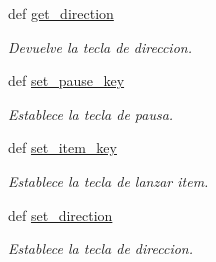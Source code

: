 \begin{DoxyCompactItemize}
def \hyperlink{classengine_1_1config_1_1Config_aa1230146da9219b1d708049842c817a3}{get\-\_\-direction}
\begin{DoxyCompactList}\small\item\em \-Devuelve la tecla de direccion. \end{DoxyCompactList}\item 
def \hyperlink{classengine_1_1config_1_1Config_a3b0cbd7f309301ddf8ef340f466da061}{set\-\_\-pause\-\_\-key}
\begin{DoxyCompactList}\small\item\em \-Establece la tecla de pausa. \end{DoxyCompactList}\item 
def \hyperlink{classengine_1_1config_1_1Config_abade5c277e0c3215c92ddfc5280bfba4}{set\-\_\-item\-\_\-key}
\begin{DoxyCompactList}\small\item\em \-Establece la tecla de lanzar item. \end{DoxyCompactList}\item 
def \hyperlink{classengine_1_1config_1_1Config_a8687f5ceb465bfd7edb717e324084c0a}{set\-\_\-direction}
\begin{DoxyCompactList}\small\item\em \-Establece la tecla de direccion. \end{DoxyCompactList}\end{DoxyCompactItemize}
